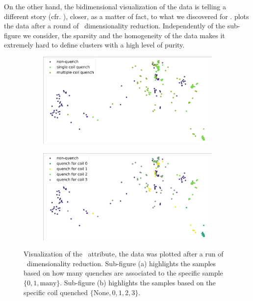 On the other hand, the bidimensional visualization of the data is telling a different story (cfr.
), closer, as a matter of fact, to what we discovered for \bn.  plots the data after a round of \pca\ dimensionality reduction. Independently of the sub-figure we consider, the sparsity and the homogeneity of the data makes it
extremely hard to define clusters with a high level of purity.
\begin{figure}[!ht]
	\centering
	\begin{subfigure}{0.6\linewidth}
		\centering
		\includegraphics[width=\linewidth]{img/quench_dist_qlp/single_vs_multiple_Phi.png}
		\subcaption{}
	\end{subfigure}
	\begin{subfigure}{0.6\linewidth}
		\centering
		\includegraphics[width=\linewidth]{img/quench_dist_qlp_phi.png}
		\subcaption{}
	\end{subfigure}
	\caption{Visualization of the \phin\ attribute, the data was plotted after a run of \pca\
		dimensionality reduction. Sub-figure (a) highlights the samples based on how many quenches
		are associated to the specific sample $\{0, 1, \text{many}\}$. Sub-figure (b) highlights the
		samples based on the specific coil quenched $\{\text{None}, 0, 1, 2, 3\}$.}
	\label{fig:phi-coilq-dist}
\end{figure}

